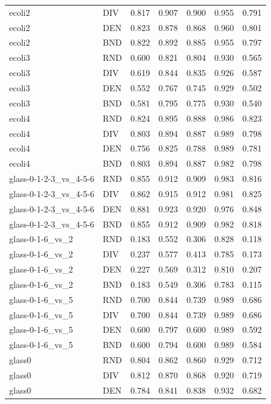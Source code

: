 \documentclass[10pt,a4paper]{article}
\begin{document}
\begin{longtable}{lllllrr}
ecoli2 & DIV & 0.817 & 0.907 & 0.900 & 0.955 & 0.791 \\
ecoli2 & DEN & 0.823 & 0.878 & 0.868 & 0.960 & 0.801 \\
ecoli2 & BND & 0.822 & 0.892 & 0.885 & 0.955 & 0.797 \\
ecoli3 & RND & 0.600 & 0.821 & 0.804 & 0.930 & 0.565 \\
ecoli3 & DIV & 0.619 & 0.844 & 0.835 & 0.926 & 0.587 \\
ecoli3 & DEN & 0.552 & 0.767 & 0.745 & 0.929 & 0.502 \\
ecoli3 & BND & 0.581 & 0.795 & 0.775 & 0.930 & 0.540 \\
ecoli4 & RND & 0.824 & 0.895 & 0.888 & 0.986 & 0.823 \\
ecoli4 & DIV & 0.803 & 0.894 & 0.887 & 0.989 & 0.798 \\
ecoli4 & DEN & 0.756 & 0.825 & 0.788 & 0.989 & 0.781 \\
ecoli4 & BND & 0.803 & 0.894 & 0.887 & 0.982 & 0.798 \\
glass-0-1-2-3\_vs\_4-5-6 & RND & 0.855 & 0.912 & 0.909 & 0.983 & 0.816 \\
glass-0-1-2-3\_vs\_4-5-6 & DIV & 0.862 & 0.915 & 0.912 & 0.981 & 0.825 \\
glass-0-1-2-3\_vs\_4-5-6 & DEN & 0.881 & 0.923 & 0.920 & 0.976 & 0.848 \\
glass-0-1-2-3\_vs\_4-5-6 & BND & 0.855 & 0.912 & 0.909 & 0.982 & 0.818 \\
glass-0-1-6\_vs\_2 & RND & 0.183 & 0.552 & 0.306 & 0.828 & 0.118 \\
glass-0-1-6\_vs\_2 & DIV & 0.237 & 0.577 & 0.413 & 0.785 & 0.173 \\
glass-0-1-6\_vs\_2 & DEN & 0.227 & 0.569 & 0.312 & 0.810 & 0.207 \\
glass-0-1-6\_vs\_2 & BND & 0.183 & 0.549 & 0.306 & 0.783 & 0.115 \\
glass-0-1-6\_vs\_5 & RND & 0.700 & 0.844 & 0.739 & 0.989 & 0.686 \\
glass-0-1-6\_vs\_5 & DIV & 0.700 & 0.844 & 0.739 & 0.989 & 0.686 \\
glass-0-1-6\_vs\_5 & DEN & 0.600 & 0.797 & 0.600 & 0.989 & 0.592 \\
glass-0-1-6\_vs\_5 & BND & 0.600 & 0.794 & 0.600 & 0.989 & 0.584 \\
glass0 & RND & 0.804 & 0.862 & 0.860 & 0.929 & 0.712 \\
glass0 & DIV & 0.812 & 0.870 & 0.868 & 0.920 & 0.719 \\
glass0 & DEN & 0.784 & 0.841 & 0.838 & 0.932 & 0.682 \\

\end{longtable}
\end{document}
